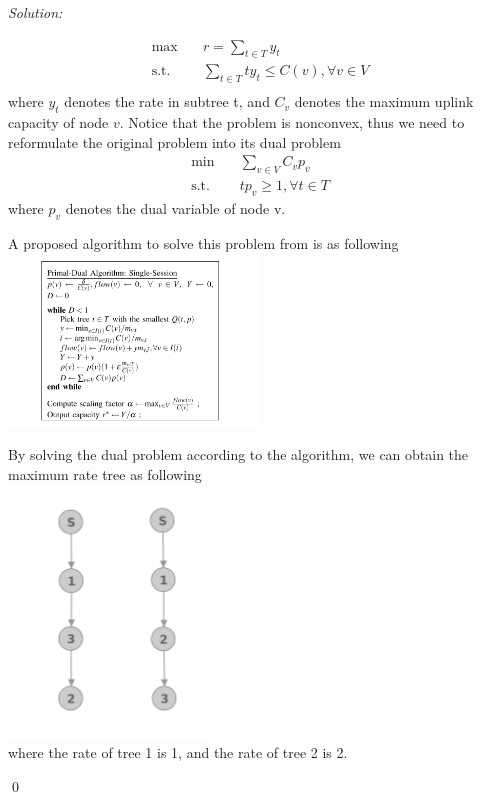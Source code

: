 \documentclass[12pt]{article}
\newenvironment{sol}
    {\emph{Solution:}
    }
    {
    \qed
    }
\begin{document}
\begin{sol}
	\begin{equation}
		\begin{aligned}
		\max \quad & r = \sum_{t\in T} y_t \\
		\textrm{s.t.} \quad & \sum_{t\in T}ty_t \leq C(v), \forall v \in V \\
		\end{aligned}
	\end{equation}
	where $y_t$ denotes the rate in subtree t, and $C_v$ denotes the maximum uplink capacity of node $v$. Notice that the problem is nonconvex, thus we need to reformulate the original problem into its dual problem
	\begin{equation}
		\begin{aligned}
		\min \quad & \sum_{v\in V} C_vp_v \\
		\textrm{s.t.} \quad & tp_v\geq 1, \forall t \in T 
		\end{aligned}
	\end{equation}
	where $p_v$ denotes the dual variable of node v. \par 
	A proposed algorithm to solve this problem from is as following \\
	\includegraphics[width=0.5\textwidth]{5.png} \par
	By solving the dual problem according to the algorithm, we can obtain the maximum rate tree as following\\
	\includegraphics[width=0.4\textwidth]{7.png} \\
	where the rate of tree 1 is 1, and the rate of tree 2 is 2. 
\end{sol}
\end{document}
